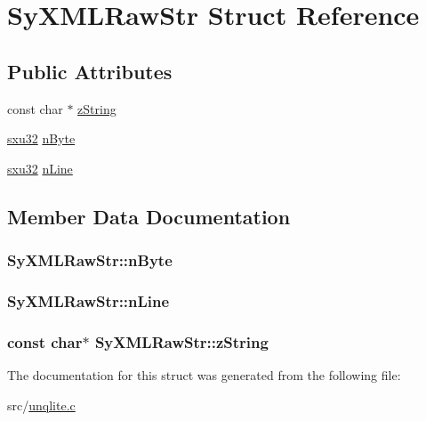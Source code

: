 \hypertarget{struct_sy_x_m_l_raw_str}{\section{Sy\-X\-M\-L\-Raw\-Str Struct Reference}
\label{d2/d47/struct_sy_x_m_l_raw_str}
}
\subsection*{Public Attributes}
\begin{DoxyCompactItemize}
\item 
const char $\ast$ \hyperlink{struct_sy_x_m_l_raw_str_af2717a7fa9d1e2779acff01f2fa8c06a}{z\-String}
\item 
\hyperlink{unqlite_8c_abc5a8a3f345c200c98c485551f49666e}{sxu32} \hyperlink{struct_sy_x_m_l_raw_str_a43a08ab9a885506206babd52c8eddc2d}{n\-Byte}
\item 
\hyperlink{unqlite_8c_abc5a8a3f345c200c98c485551f49666e}{sxu32} \hyperlink{struct_sy_x_m_l_raw_str_a0197cc3f790d1bebf6d1dd0d1652993a}{n\-Line}
\end{DoxyCompactItemize}


\subsection{Member Data Documentation}
\hypertarget{struct_sy_x_m_l_raw_str_a43a08ab9a885506206babd52c8eddc2d}{
\subsubsection[{n\-Byte}]{ Sy\-X\-M\-L\-Raw\-Str\-::n\-Byte}}\label{d2/d47/struct_sy_x_m_l_raw_str_a43a08ab9a885506206babd52c8eddc2d}
\hypertarget{struct_sy_x_m_l_raw_str_a0197cc3f790d1bebf6d1dd0d1652993a}{
\subsubsection[{n\-Line}]{ Sy\-X\-M\-L\-Raw\-Str\-::n\-Line}}\label{d2/d47/struct_sy_x_m_l_raw_str_a0197cc3f790d1bebf6d1dd0d1652993a}
\hypertarget{struct_sy_x_m_l_raw_str_af2717a7fa9d1e2779acff01f2fa8c06a}{
\subsubsection[{z\-String}]{\setlength{\rightskip}{0pt plus 5cm}const char$\ast$ Sy\-X\-M\-L\-Raw\-Str\-::z\-String}}\label{d2/d47/struct_sy_x_m_l_raw_str_af2717a7fa9d1e2779acff01f2fa8c06a}


The documentation for this struct was generated from the following file\-:\begin{DoxyCompactItemize}
\item 
src/\hyperlink{unqlite_8c}{unqlite.\-c}\end{DoxyCompactItemize}
